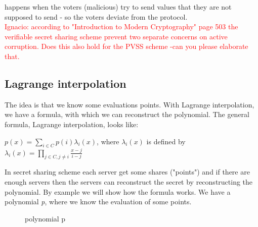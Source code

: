  happens when the voters (malicious) try to send values that they are not supposed to send - so the voters deviate from the protocol. \\
\textcolor{red}{Ignacio: according to "Introduction to Modern Cryptography" page 503 the verifiable secret sharing scheme prevent two separate concerns on active corruption. Does this also hold for the PVSS scheme -can you please elaborate that. }


\subsection{Lagrange interpolation}
The idea is that we know some evaluations points. With Lagrange interpolation, we have a formula, with which we can reconstruct the polynomial.
The general formula, Lagrange interpolation, looks like:



\begin{defi}
\begin{math}p(x)=\sum\limits_{i \in C} p(i)\lambda_i(x)\end{math}, where $\lambda_i(x)$ is defined by \begin{math} \lambda_i(x)=\prod\limits_{j\in C,j\neq i}  \frac{x-j}{i-j} \end{math}
\end{defi}



\noindent
In secret sharing scheme each server get some shares ("points") and if there are enough servers then the servers can reconstruct the secret by reconstructing the polynomial. By example we will show how the formula works.  We have a polynomial \textit{p}, where we know the evaluation of some points.

\begin{figure}[H]
    \centering
    \caption{polynomial p}
\end{figure}

